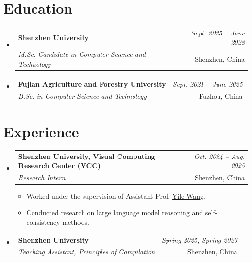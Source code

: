 \documentclass[a4paper,11pt]{article}
\makeatletter
\newcommand{\resumeSubheading}[4]{
\vspace{0.5mm}\item
    \begin{tabular*}{0.98\textwidth}[t]{l@{\extracolsep{\fill}}r}
        \textbf{#1} & \textit{\footnotesize{#4}} \\
        \textit{\footnotesize{#3}} &  \footnotesize{#2}\\
    \end{tabular*}
    \vspace{-2.4mm}
}
\newcommand{\resumeSubHeadingListStart}{\begin{itemize}[leftmargin=*,labelsep=1mm]}
\newcommand{\resumeItemListStart}{\begin{itemize}[leftmargin=*,labelsep=1mm,itemsep=0.5mm]}
\newcommand{\resumeSubHeadingListEnd}{\end{itemize}\vspace{2mm}}
\newcommand{\resumeItemListEnd}{\end{itemize}\vspace{-2mm}}
\makeatother
\begin{document}
        

\section{\textbf{Education}}
    \vspace{-0.4mm}
    \resumeSubHeadingListStart

    \resumeSubheading
    {Shenzhen University}{Shenzhen, China}
    {M.Sc. Candidate in Computer Science and Technology}{Sept. 2025 -- June 2028}

    \resumeSubheading
    {Fujian Agriculture and Forestry University}{Fuzhou, China}
    {B.Sc. in Computer Science and Technology}{Sept. 2021 -- June 2025}

    \resumeSubHeadingListEnd

\vspace{-2mm}

\section{\textbf{Experience}}
\vspace{-0.4mm}
  \resumeSubHeadingListStart
  \resumeSubheading
      {Shenzhen University, Visual Computing Research Center (VCC)}{Shenzhen, China}
      {Research Intern}{Oct. 2024 -- Aug. 2025}
      \resumeItemListStart
        \item Worked under the supervision of Assistant Prof. \href{https://ylwangy.github.io/}{Yile Wang}.
        \item Conducted research on large language model reasoning and self-consistency methods.
      \resumeItemListEnd
  \resumeSubheading
      {Shenzhen University}{Shenzhen, China}
      {Teaching Assistant, Principles of Compilation}{Spring 2025, Spring 2026}
  \resumeSubHeadingListEnd

\vspace{-2mm}
\end{document}
